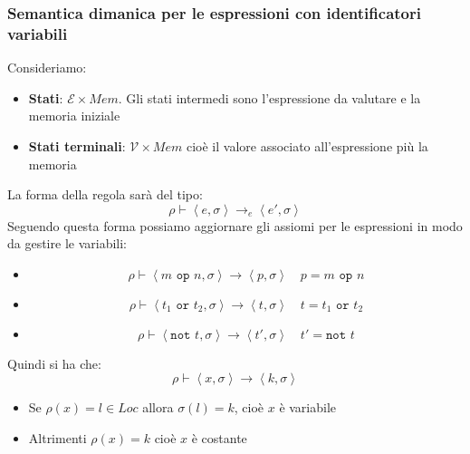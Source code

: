 \documentclass[a4paper]{article}
\begin{document}
\subsubsection{Semantica dimanica per le espressioni con identificatori variabili}
Consideriamo:
\begin{itemize}
  \item \textbf{Stati}: \( \mathcal{E} \times Mem \). Gli stati intermedi sono
    l'espressione da valutare e la memoria iniziale

  \item \textbf{Stati terminali}: \( \mathcal{V} \times Mem \) cioè il valore
    associato all'espressione più la memoria
\end{itemize}
La forma della regola sarà del tipo:
\[
  \rho \vdash \left<e, \sigma  \right> \to_e \left<e', \sigma \right>
\] 
Seguendo questa forma possiamo aggiornare gli assiomi per le espressioni in modo da
gestire le variabili:
\begin{itemize}
  \item 
    \[
      \rho \vdash \left< m \texttt{ op } n , \sigma \right> \to \left< p, \sigma  \right>
      \quad p = m \texttt{ op } n
    \] 

  \item 
    \[
      \rho \vdash \left< t_1 \texttt{ or } t_2 , \sigma \right> \to
      \left< t, \sigma  \right> \quad t = t_1 \texttt{ or } t_2
    \]

  \item
    \[
      \rho \vdash \left< \texttt{not } t , \sigma \right> \to
      \left< t', \sigma  \right> \quad t' = \texttt{not } t
    \]
\end{itemize}
Quindi si ha che:
\[
  \rho \vdash \left< x, \sigma \right> \to \left< k, \sigma  \right>
\] 
\begin{itemize}
  \item Se \( \rho(x) = l \in Loc \) allora \( \sigma(l) = k \), cioè \( x \) è
    variabile

  \item Altrimenti \( \rho(x) = k \) cioè \( x \) è costante
\end{itemize}
\end{document}
